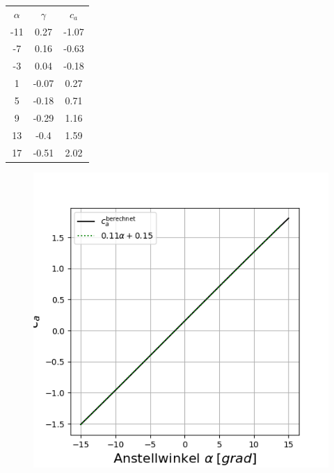 \begin{minipage}{0.45\textwidth}
\begin{table}[H]
    \centering
    \begin{tabular}{c|cc}
    $\alpha$ & $\gamma$ & $c_a$ \\
        -11 & 0.27 & -1.07 \\ 
-7 & 0.16 & -0.63 \\ 
-3 & 0.04 & -0.18 \\ 
1 & -0.07 & 0.27 \\ 
5 & -0.18 & 0.71 \\ 
9 & -0.29 & 1.16 \\ 
13 & -0.4 & 1.59 \\ 
17 & -0.51 & 2.02 \\ 


    \end{tabular}
    \label{tab:zone}
\end{table}
\end{minipage}
\hfill
\begin{minipage}{0.45\textwidth}
\begin{figure}[H]
    \centering
    \includegraphics[scale=0.4]{figures/zoneca.png}
    \label{fig:zoneca}
\end{figure}
\end{minipage}

